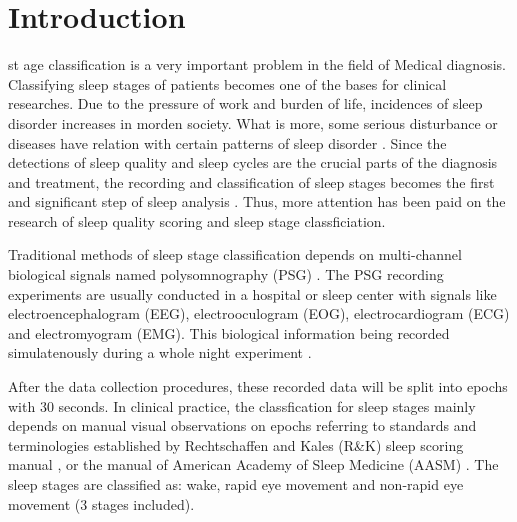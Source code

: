 \documentclass[journal]{IEEEtran}
\begin{document}
\section{Introduction}
% 
% 
% 
% 
 st  age classification is a very important problem in the field of Medical diagnosis. Classifying sleep stages of patients becomes one of the bases for clinical researches. Due to the pressure of work and burden of life, incidences of sleep disorder increases in morden society. What is more, some serious disturbance or diseases have relation with certain patterns of sleep disorder \cite{nakamura2017complexity}. Since the detections of sleep quality and sleep cycles are the crucial parts of the diagnosis and treatment, the recording and classification of sleep stages becomes the first and significant step of sleep analysis \cite{zhang2017sleep}. Thus, more attention has been paid on the research of sleep quality scoring and sleep stage classficiation.

Traditional methods of sleep stage classification depends on multi-channel biological signals named polysomnography (PSG) \cite{prabhavalkar2017analysis}. The PSG recording experiments are usually conducted in a hospital or sleep center with signals like electroencephalogram (EEG), electrooculogram (EOG), electrocardiogram (ECG) and electromyogram (EMG). This biological information being recorded simulatenously during a whole night experiment \cite{ronzhina2012sleep}.

After the data collection procedures, these recorded data will be split into epochs with 30 seconds. In clinical practice, the classfication for sleep stages mainly depends on manual visual observations on epochs referring to standards and terminologies established by Rechtschaffen and Kales (R\&K) sleep scoring manual \cite{rechtschaffen1968manual}, or the manual of American Academy of Sleep Medicine (AASM) \cite{berry2012aasm}. The sleep stages are classified as: wake, rapid eye movement and non-rapid eye movement (3 stages included).
\end{document}
